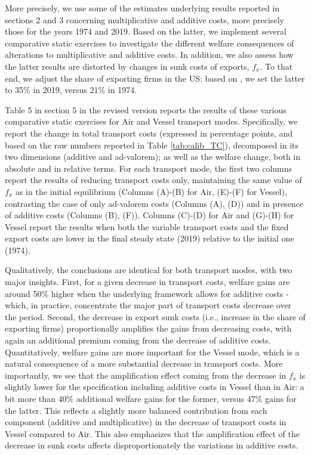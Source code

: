 \documentclass[a4paper,11pt]{article}
\begin{document}
More precisely, we use some of the estimates underlying results reported in sections 2 and 3 concerning multiplicative and additive costs, more precisely those for the years 1974 and 2019. Based on the latter, we implement several comparative static exercises to investigate the different welfare consequences of alterations to multiplicative and additive costs. In addition, we also assess how the latter results are distorted by changes in sunk costs of exports, $f_{x}$. To that end, we adjust the share of exporting firms in the US: based on \citet{Lincoln_McCallum2018}, we set the latter to 35\% in 2019, versus 21\% in 1974.

Table 5 in section 5 in the revised version reports the results of these various comparative static exercises for Air and Vessel transport modes. Specifically, we report the change in total transport costs (expressed in percentage points, and based on the raw numbers reported in Table \ref{tab:calib_TC}), decomposed in its two dimensions (additive and ad-valorem); as well as the welfare change, both in absolute and in relative terms. For each transport mode, the first two columns report the results of reducing transport costs only, maintaining the same value of $f_x$ as in the initial equilibrium (Columns (A)-(B) for Air, (E)-(F) for Vessel), contrasting the case of only ad-valorem costs (Columns (A), (D)) and in presence of additive costs (Columns (B), (F)). Columns (C)-(D) for Air and (G)-(H) for Vessel report the results when both the variable transport costs and the fixed export costs are lower in the final steady state (2019) relative to the initial one (1974).

Qualitatively, the conclusions are identical for both transport modes, with two major insights. First, for a given decrease in transport costs,  welfare gains are around 50\% higher when the underlying framework allows for additive costs - which, in practice, concentrate the major part of transport costs decrease over the period. Second, the decrease in export sunk costs (i.e., increase in the share of exporting firms) proportionally amplifies the gains from decreasing costs, with again an additional premium coming from the decrease of additive costs. Quantitatively, welfare gains are more important for the Vessel mode, which is a natural consequence of a more substantial decrease in transport costs. More importantly, we see that the amplification effect coming from the decrease in $f_{x}$ is slightly lower for the specification including additive costs  in Vessel than in Air: a bit more than 40\% additional welfare gains for the former, versus 47\% gains for the latter. This reflects a slightly more balanced contribution from each component (additive and multiplicative) in the decrease of transport costs in Vessel compared to Air. This also emphasizes that the amplification effect of the decrease in sunk costs affects disproportionately the variations in additive costs.
\end{document}

